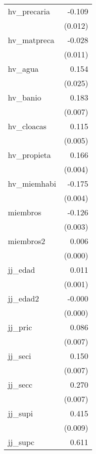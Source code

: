 {\begin{longtable}{l*{1}{D{.}{.}{-1}}}
\addlinespace
hv\_precaria &      -0.109\sym{***}\\
            &     (0.012)         \\
\addlinespace
hv\_matpreca &      -0.028\sym{*}  \\
            &     (0.011)         \\
\addlinespace
hv\_agua     &       0.154\sym{***}\\
            &     (0.025)         \\
\addlinespace
hv\_banio    &       0.183\sym{***}\\
            &     (0.007)         \\
\addlinespace
hv\_cloacas  &       0.115\sym{***}\\
            &     (0.005)         \\
\addlinespace
hv\_propieta &       0.166\sym{***}\\
            &     (0.004)         \\
\addlinespace
hv\_miemhabi &      -0.175\sym{***}\\
            &     (0.004)         \\
\addlinespace
miembros    &      -0.126\sym{***}\\
            &     (0.003)         \\
\addlinespace
miembros2   &       0.006\sym{***}\\
            &     (0.000)         \\
\addlinespace
jj\_edad     &       0.011\sym{***}\\
            &     (0.001)         \\
\addlinespace
jj\_edad2    &      -0.000\sym{***}\\
            &     (0.000)         \\
\addlinespace
jj\_pric     &       0.086\sym{***}\\
            &     (0.007)         \\
\addlinespace
jj\_seci     &       0.150\sym{***}\\
            &     (0.007)         \\
\addlinespace
jj\_secc     &       0.270\sym{***}\\
            &     (0.007)         \\
\addlinespace
jj\_supi     &       0.415\sym{***}\\
            &     (0.009)         \\
\addlinespace
jj\_supc     &       0.611\sym{***}\\

\end{longtable}}
